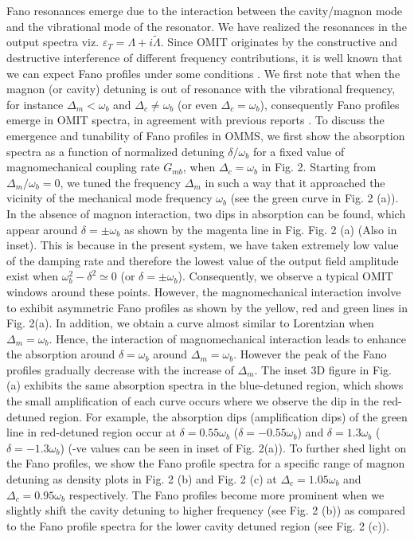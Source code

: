 \documentclass[aps,pra,superscriptaddress,balancelastpage,twocolumn]{revtex4}
\begin{document}
Fano resonances emerge due to the interaction between the cavity/magnon mode
and the vibrational mode of the resonator. We have realized the resonances
in the output spectra viz. $\varepsilon _{T}=\Lambda+i\tilde{\Lambda}$.
Since OMIT originates by the constructive and destructive interference of
different frequency contributions, it is well known that we can expect Fano
profiles under some conditions \cite{KQGS}.
We first note that when the magnon (or cavity) detuning is out of resonance
with the vibrational frequency, for instance $\Delta_{m}<\omega_{b}$ and $%
\Delta_{c}\neq\omega_{b}$ (or even $\Delta_{c}=\omega_{b}$), consequently
Fano profiles emerge in OMIT spectra, in agreement with previous reports
\cite{KQGS,MYPOM1}. To discuss the emergence and tunability of Fano profiles
in OMMS, we first show the absorption spectra as a function of normalized
detuning $\delta/\omega_{b}$ for a fixed value of magnomechanical coupling
rate $G_{mb}$, when $\Delta_{c}=\omega_{b}$ in Fig. 2. Starting from $%
\Delta_{m}/\omega_{b}=0$, we tuned the frequency $\Delta_{m}$ in such a way
that it approached the vicinity of the mechanical mode frequency $\omega_{b}$
(see the green curve in Fig. 2 (a)).
In the absence of magnon interaction, two dips in absorption can be found,
which appear around $\delta=\pm\omega_{b}$ as shown by the magenta line in
Fig. Fig. 2 (a) (Also in inset). This is because in the present system, we
have taken extremely low value of the damping rate and therefore the lowest
value of the output field amplitude exist when $\omega _{b}^{2}-\delta
^{2}\simeq0$ (or $\delta=\pm\omega _{b}$). Consequently, we observe a
typical OMIT windows around these points. However, the magnomechanical
interaction involve to exhibit asymmetric Fano profiles as shown by the
yellow, red and green lines in Fig. 2(a). In addition, we obtain a curve
almost similar to Lorentzian when $\Delta_{m}=\omega_{b} $. Hence, the
interaction of magnomechanical interaction leads to enhance the absorption
around $\delta=\omega_{b}$ around $\Delta_{m}=\omega_{b} $. However the peak
of the Fano profiles gradually decrease with the increase of $\Delta_{m}$.
The inset 3D figure in Fig. (a) exhibits the same absorption spectra in the
blue-detuned region, which shows the small amplification of each curve
occurs where we observe the dip in the red-detuned region. For example, the
absorption dips (amplification dips) of the green line in red-detuned region
occur at $\delta=0.55\omega_{b}$ ($\delta=-0.55\omega_{b}$) and $%
\delta=1.3\omega_{b}$ ($\delta=-1.3\omega_{b}$) (-ve values can be seen in
inset of Fig. 2(a)). To further shed light on the Fano profiles, we show the
Fano profile spectra for a specific range of magnon detuning as density
plots in Fig. 2 (b) and Fig. 2 (c) at $\Delta_{c}=1.05\omega_{b}$ and $%
\Delta_{c}=0.95\omega_{b}$ respectively. The Fano profiles become more
prominent when we slightly shift the cavity detuning to higher frequency
(see Fig. 2 (b)) as compared to the Fano profile spectra for the lower
cavity detuned region (see Fig. 2 (c)).
\end{document}

